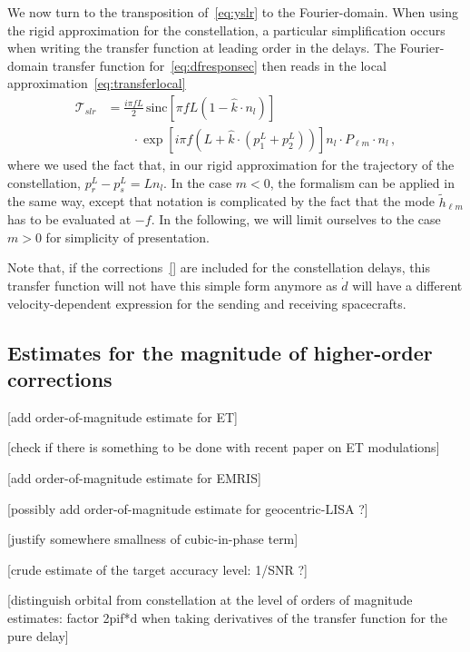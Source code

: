 \documentclass[aps,showpacs,twocolumn,
prd,superscriptaddress,nofootinbib]{revtex4-1}
\newcommand\calT{{\mathcal{T}}}
\newcommand{\nn}{\nonumber}
\newcommand{\sinc}{\,\mathrm{sinc}}
\newcommand{\SM}[1]{{\color{Red} #1}}
\begin{document}
We now turn to the transposition of~\eqref{eq:yslr} to the Fourier-domain. When using the rigid approximation for the constellation, a particular simplification occurs when writing the transfer function at leading order in the delays. The Fourier-domain transfer function for~\eqref{eq:dfresponsec} then reads in the local approximation~\eqref{eq:transferlocal}
\begin{align}
	\calT_{slr} &= \frac{i \pi f L}{2} \sinc \left[ \pi f L\left(1-\hat{k}\cdot n_{l} \right) \right] \nn\\
	& \qquad \cdot \exp\left[ i \pi f \left( L + \hat{k}\cdot \left( p_{1}^{L} + p_{2}^{L} \right) \right) \right]  n_{l} \cdot P_{\ell m} \cdot n_{l} \,,
\end{align}
where we used the fact that, in our rigid approximation for the trajectory of the constellation, $p^{L}_{r} - p^{L}_{s} =  L n_{l}$. In the case $m<0$, the formalism can be applied in the same way, except that notation is complicated by the fact that the mode $\tilde{h}_{\ell m}$ has to be evaluated at $-f$. In the following, we will limit ourselves to the case $m>0$ for simplicity of presentation.

Note that, if the corrections~\eqref{} are included for the constellation delays, this transfer function will not have this simple form anymore as $\dot{d}$ will have a different velocity-dependent expression for the sending and receiving spacecrafts.


\subsection{Estimates for the magnitude of higher-order corrections}
\label{subsec:sizecorrLISA}

\SM{[add order-of-magnitude estimate for ET]}

\SM{[check if there is something to be done with recent paper on ET modulations]}

\SM{[add order-of-magnitude estimate for EMRIS]}

\SM{[possibly add order-of-magnitude estimate for geocentric-LISA ?]}

\SM{[justify somewhere smallness of cubic-in-phase term]}

\SM{[crude estimate of the target accuracy level: 1/SNR ?]}

\SM{[distinguish orbital from constellation at the level of orders of magnitude estimates: factor 2pif*d when taking derivatives of the transfer function for the pure delay]}
\end{document}
